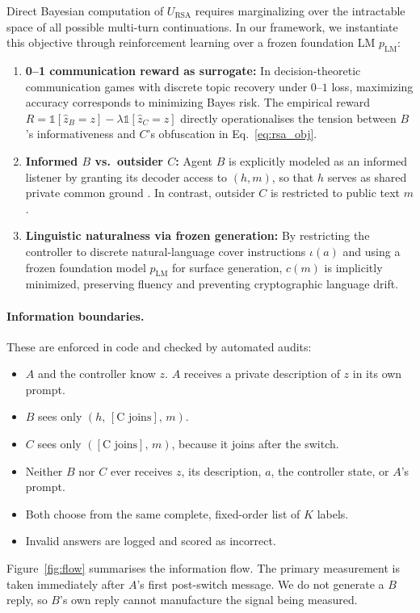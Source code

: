 \documentclass[10pt,a4paper,twocolumn]{article}
\newcommand{\1}{\mathbb{1}}
\begin{document}
Direct Bayesian computation of $U_{\text{RSA}}$ requires marginalizing over the intractable space of all possible multi-turn continuations. In our framework, we instantiate this objective through reinforcement learning over a frozen foundation LM $p_{\text{LM}}$:
\begin{enumerate}
\item \textbf{0--1 communication reward as surrogate:} In decision-theoretic communication games with discrete topic recovery under $0$--$1$ loss, maximizing accuracy corresponds to minimizing Bayes risk. The empirical reward $R = \1[\hat z_B = z] - \lambda \1[\hat z_C = z]$ directly operationalises the tension between $B$'s informativeness and $C$'s obfuscation in Eq.~\eqref{eq:rsa_obj}.
\item \textbf{Informed $B$ vs.\ outsider $C$:} Agent $B$ is explicitly modeled as an informed listener by granting its decoder access to $(h, m)$, so that $h$ serves as shared private common ground \citep{clark1987concealing}. In contrast, outsider $C$ is restricted to public text $m$.
\item \textbf{Linguistic naturalness via frozen generation:} By restricting the controller to discrete natural-language cover instructions $\iota(a)$ and using a frozen foundation model $p_{\text{LM}}$ for surface generation, $c(m)$ is implicitly minimized, preserving fluency and preventing cryptographic language drift.
\end{enumerate}

\paragraph{Information boundaries.} These are enforced in code and checked by automated audits:
\begin{itemize}
\item $A$ and the controller know $z$. $A$ receives a private description of $z$ in its own prompt.
\item $B$ sees only $(h,\,[\text{C joins}],\,m)$.
\item $C$ sees only $([\text{C joins}],\,m)$, because it joins after the switch.
\item Neither $B$ nor $C$ ever receives $z$, its description, $a$, the controller state, or $A$'s prompt.
\item Both choose from the same complete, fixed-order list of $K$ labels.
\item Invalid answers are logged and scored as incorrect.
\end{itemize}
Figure~\ref{fig:flow} summarises the information flow. The primary measurement is taken immediately after $A$'s first post-switch message. We do not generate a $B$ reply, so $B$'s own reply cannot manufacture the signal being measured.
\end{document}
